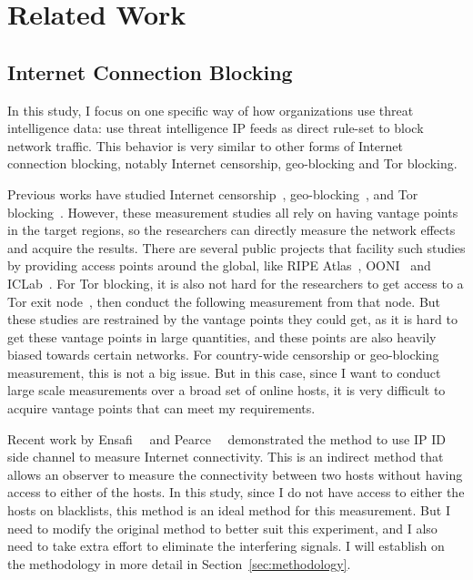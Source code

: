 \section{Related Work}

\subsection{Internet Connection Blocking}
In this study, I focus on one specific way of how organizations use 
threat intelligence data: use threat intelligence IP feeds as direct rule-set 
to block network traffic. This behavior is very similar to other forms of
Internet connection blocking, notably Internet censorship,
geo-blocking and Tor blocking.

Previous works have studied Internet censorship~\cite{aryan2013internet,
park2010empirical,anderson2012splinternet,zittrain2003internet,
clayton2006ignoring}, geo-blocking~\cite{opennetsurvey, mcdonald2018403,afroz2018exploring}, 
and Tor blocking~\cite{singh2017characterizing, khattak2016you}. However, 
these measurement studies all rely on having vantage points in the target 
regions, so the researchers can directly measure the network effects and 
acquire the results. There are several public projects that facility such 
studies by providing access points around the global, like RIPE
Atlas~\cite{ripeatlas}, OONI~\cite{ooni} and ICLab~\cite{iclab}.
For Tor blocking, it is also not hard for the researchers to get access 
to a Tor exit node~\cite{khattak2016you}, then conduct the following 
measurement from that node. But these studies are restrained by the vantage
points they could get, as it is hard to get these vantage points in large
quantities, and these points are also heavily biased towards certain networks.
For country-wide censorship or geo-blocking measurement, this is not a big
issue. But in this case, since I want to conduct large scale measurements over 
a broad set of online hosts, it is very difficult to acquire vantage points 
that can meet my requirements.

Recent work by Ensafi~\etal~\cite{ensafi2014detecting} and Pearce~\etal~\cite{pearce2017augur} demonstrated the method to use IP ID side 
channel to measure Internet connectivity. This is an indirect method 
that allows an observer to measure the connectivity between two hosts 
without having access to either of the hosts. In this study, since I do not 
have access to either the hosts on blacklists, this method is an ideal 
method for this measurement. But I need to modify the original method 
to better suit this experiment, and I also need to take extra effort 
to eliminate the interfering signals. I will establish on the methodology 
in more detail in Section~\ref{sec:methodology}.

